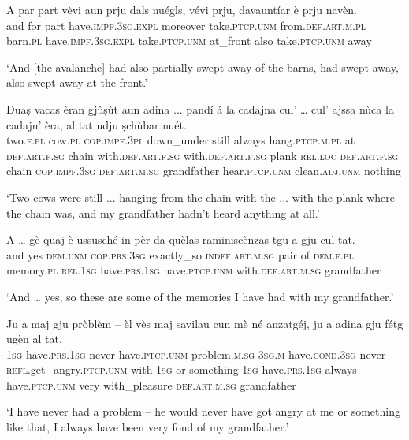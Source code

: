 \begin{linenumbers}
\gll  A par part vèvi aun prju dals nuégls, vévi prju, davauntíar è prju navèn.\\
and for part have.\textsc{impf.3sg.expl} moreover take.\textsc{ptcp.unm} from.\textsc{def.art.m.pl} barn.\textsc{pl} 
have.\textsc{impf.3sg.expl} take.\textsc{ptcp.unm} at\_front also take.\textsc{ptcp.unm} away \\
\end{linenumbers}
\medskip
\glt `And [the avalanche] had also partially swept away of the barns, had swept away, also swept away at the front.'
\medskip

\begin{linenumbers}
\gll  Duaṣ vacas èran gjùṣùt aun adina ...  pandí\footnotemark{} á la cadajna cul’ … cul’ ajssa nùca la cadajn' èra, al tat udju ṣchùbar nuét.  \\
 two.\textsc{f.pl} cow.\textsc{pl} \textsc{cop.impf.3pl} down\_under still always {} hang.\textsc{ptcp.m.pl} at \textsc{def.art.f.sg} chain with.\textsc{def.art.f.sg} {} with.\textsc{def.art.f.sg} plank \textsc{rel.loc} \textsc{def.art.f.sg} chain \textsc{cop.impf.3sg} \textsc{def.art.m.sg} grandfather hear.\textsc{ptcp.unm} clean.\textsc{adj.unm} nothing\\
\end{linenumbers}
\medskip
\glt `Two cows were still ... hanging  from the chain with the ... with the plank where the chain was, and my grandfather hadn’t heard anything at all.’
\medskip

\begin{linenumbers}
\gll  A … gè quaj è ussusché in pèr da quèlas raminiscènzas tgu a gju cul tat.\\
and {} yes  \textsc{dem.unm} \textsc{cop.prs.3sg} exactly\_so  \textsc{indef.art.m.sg} pair of  \textsc{dem.f.pl} memory.\textsc{pl}  \textsc{rel.1sg} have.\textsc{prs.1sg} have.\textsc{ptcp.unm}  with.\textsc{def.art.m.sg} grandfather \\
\end{linenumbers}
\medskip
\glt `And … yes, so these are some of the memories I have had with my grandfather.'
\medskip

\begin{linenumbers}
\gll Ju a maj gju pròblèm – èl vès maj savilau cun mè né anzatgéj, ju a adina gju fétg ugèn al tat.   \\
 \textsc{1sg} have.\textsc{prs.1sg} never have.\textsc{ptcp.unm} problem.\textsc{m.sg} {} \textsc{3sg.m} have.\textsc{cond.3sg} never \textsc{refl}.get\_angry.\textsc{ptcp.unm} with \textsc{1sg} or something \textsc{1sg} have.\textsc{prs.1sg} always have.\textsc{ptcp.unm} very with\_pleasure \textsc{def.art.m.sg} grandfather\\
\end{linenumbers}
\medskip
\glt `I have never had a problem – he would never have got angry at me or something like that, I always have been very fond of my grandfather.'
\medskip


